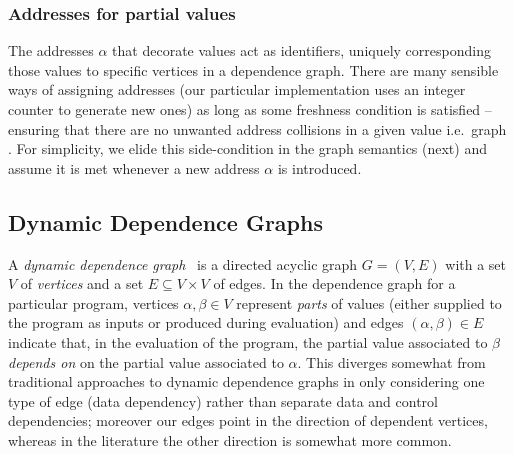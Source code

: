 \subsubsection{Addresses for partial values}
\label{sec:core:addresses}
 The addresses $\alpha$ that decorate values act as identifiers, uniquely
corresponding those values to specific vertices in a dependence graph. There are many sensible ways of
assigning addresses (our particular implementation uses an integer counter to generate new ones) as long as
some freshness condition is satisfied -- ensuring that there are no unwanted address collisions in a given
value i.e.~graph . For simplicity,
we elide this side-condition  in the graph semantics (next) and assume it is met
whenever a new address $\alpha$ is introduced. 


\subsection{Dynamic Dependence Graphs}
\label{sec:core:dependence-graphs}

% 

A \emph{dynamic dependence graph}~\cite{agrawal90} is a directed acyclic graph $G = (V,E)$ with a set $V$ of
\emph{vertices} and a set $E \subseteq V \times V$ of edges. In the dependence graph for a particular program,
vertices $\alpha, \beta \in V$ represent \emph{parts} of values (either supplied to the program as inputs or
produced during evaluation) and edges $(\alpha, \beta) \in E$ indicate that, in the evaluation of the program,
the partial value associated to $\beta$ \textit{depends on} on the partial value associated to $\alpha$. This
diverges somewhat from traditional approaches to dynamic dependence graphs in only considering one type of
edge (data dependency) rather than separate data and control dependencies; moreover our edges point in the
direction of dependent vertices, whereas in the literature the other direction is somewhat more common.

